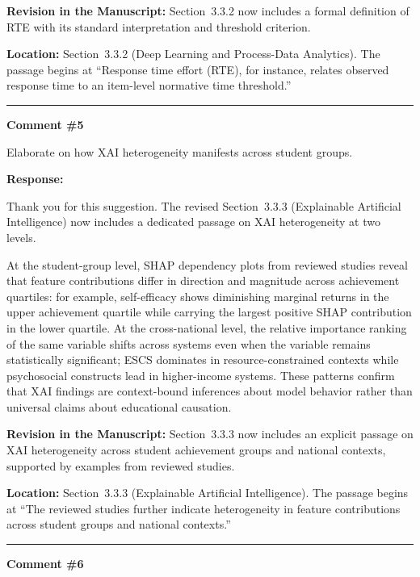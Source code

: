 \documentclass[12pt, a4paper]{article}
\begin{document}
\medskip
\noindent\textbf{Revision in the Manuscript:}
Section~3.3.2 now includes a formal definition of RTE with its standard interpretation and threshold
criterion.

\medskip
\noindent\textbf{Location:} Section~3.3.2 (Deep Learning and Process-Data Analytics). The passage
begins at ``Response time effort (RTE), for instance, relates observed response time to an
item-level normative time threshold.''

\bigskip\hrule\bigskip

\noindent\textbf{Comment \#5}

\medskip
\noindent\textcolor{reviewerblue}{%
Elaborate on how XAI heterogeneity manifests across student groups.}

\medskip
\noindent\textbf{Response:}

Thank you for this suggestion. The revised Section~3.3.3 (Explainable Artificial Intelligence) now
includes a dedicated passage on XAI heterogeneity at two levels.

At the student-group level, SHAP dependency plots from reviewed studies reveal that feature
contributions differ in direction and magnitude across achievement quartiles: for example,
self-efficacy shows diminishing marginal returns in the upper achievement quartile while carrying
the largest positive SHAP contribution in the lower quartile. At the cross-national level, the
relative importance ranking of the same variable shifts across systems even when the variable
remains statistically significant; ESCS dominates in resource-constrained contexts while
psychosocial constructs lead in higher-income systems. These patterns confirm that XAI findings
are context-bound inferences about model behavior rather than universal claims about educational
causation.

\medskip
\noindent\textbf{Revision in the Manuscript:}
Section~3.3.3 now includes an explicit passage on XAI heterogeneity across student achievement
groups and national contexts, supported by examples from reviewed studies.

\medskip
\noindent\textbf{Location:} Section~3.3.3 (Explainable Artificial Intelligence). The passage
begins at ``The reviewed studies further indicate heterogeneity in feature contributions across
student groups and national contexts.''

\bigskip\hrule\bigskip

\noindent\textbf{Comment \#6}
\end{document}
